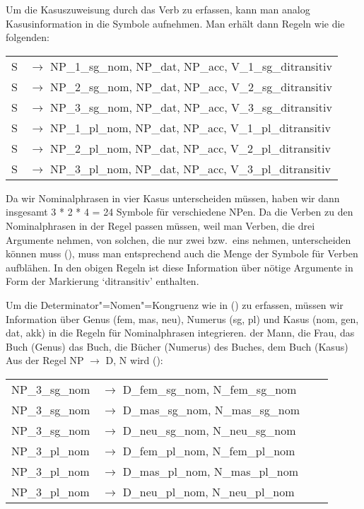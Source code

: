 Um die Kasuszuweisung durch das Verb zu erfassen, kann man analog Kasusinformation in die
Symbole aufnehmen. Man erhält dann Regeln wie die folgenden:
\ea
\label{ditrans-ps-regeln}
\begin{tabular}[t]{@{}l@{ }l}
S  & $\to$ NP\_1\_sg\_nom, NP\_dat, NP\_acc, V\_1\_sg\_ditransitiv\\
S  & $\to$ NP\_2\_sg\_nom, NP\_dat, NP\_acc, V\_2\_sg\_ditransitiv\\
S  & $\to$ NP\_3\_sg\_nom, NP\_dat, NP\_acc, V\_3\_sg\_ditransitiv\\
S  & $\to$ NP\_1\_pl\_nom, NP\_dat, NP\_acc, V\_1\_pl\_ditransitiv\\
S  & $\to$ NP\_2\_pl\_nom, NP\_dat, NP\_acc, V\_2\_pl\_ditransitiv\\
S  & $\to$ NP\_3\_pl\_nom, NP\_dat, NP\_acc, V\_3\_pl\_ditransitiv\\
\end{tabular}
\z
Da wir Nominalphrasen in vier Kasus unterscheiden müssen, haben wir dann
insgesamt 3 * 2 * 4 = 24 Symbole für verschiedene NPen. Da die Verben zu den Nominalphrasen
in der Regel passen müssen, weil man \zb Verben, die drei Argumente nehmen, von solchen,
die nur zwei bzw.\ eins nehmen, unterscheiden können muss (), muss man entsprechend auch
die Menge der Symbole für Verben aufblähen.
\eal
{}
\zl
In den obigen Regeln ist diese Information über nötige Argumente in Form der
Markierung `ditransitiv' enthalten.

Um die Determinator"=Nomen"=Kongruenz wie in () zu erfassen, müssen wir Information 
über Genus (fem, mas, neu), Numerus (sg, pl) und Kasus (nom, gen, dat, akk)
in die Regeln für Nominalphrasen integrieren.
\eal
\ex der Mann, die Frau, das Buch (Genus)
\ex das Buch, die Bücher (Numerus)
\ex des Buches, dem Buch (Kasus)
\zl
Aus der Regel NP $\to$ D, N wird ():
\ea
\begin{tabular}[t]{@{}l@{ }l@{\hspace{4mm}}l@{ }l}
NP\_3\_sg\_nom  & $\to$ D\_fem\_sg\_nom, N\_fem\_sg\_nom \\
NP\_3\_sg\_nom  & $\to$ D\_mas\_sg\_nom, N\_mas\_sg\_nom \\
NP\_3\_sg\_nom  & $\to$ D\_neu\_sg\_nom, N\_neu\_sg\_nom \\
NP\_3\_pl\_nom  & $\to$ D\_fem\_pl\_nom, N\_fem\_pl\_nom \\
NP\_3\_pl\_nom  & $\to$ D\_mas\_pl\_nom, N\_mas\_pl\_nom \\
NP\_3\_pl\_nom  & $\to$ D\_neu\_pl\_nom, N\_neu\_pl\_nom \\[2mm]
\end{tabular}

